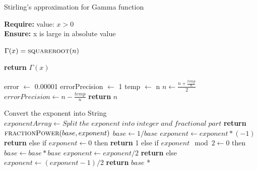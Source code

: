\documentclass[a4paper, 11pt]{article}
\begin{document}
\begin{algorithm}

\caption{Stirling's approximation for Gamma function}

\textbf{Require:}  value: $x > 0$ \\
\textbf{Ensure:} x is large in absolute value
\begin{algorithmic}[1]

    \State \indent $\Gamma (x) = \Call{squareroot}{n}$  
    
    \State \textbf{return} $\Gamma (x)$
    
    \State error $\leftarrow$ 0.00001
    \State errorPrecision $\leftarrow$ 1
    \State temp $\leftarrow$ n
        \State $n \leftarrow \frac{{n}+ \frac{temp}{n}}{2}$
        \State $errorPrecision \leftarrow n - \frac{temp}{n}$
    \EndWhile
    \State \textbf{return} $n$
    \EndProcedure
    
    \State Convert the exponent into String
    \State $exponentArray \leftarrow Split\; the\; exponent\; into\; integer\; and\; fractional\; part $
     \State \qquad \textbf{return} $\Call{fractionPower}{base, exponent}$ 
     \EndIf
     \State \qquad $base \leftarrow 1/base$
     \State \qquad $exponent \leftarrow exponent * (-1)$
     \State \textbf{return}  
     \EndIf
     \State else if $exponent \leftarrow 0$ then
     \State \qquad \textbf{return} 1 
     \State else if  $exponent \mod  2 \leftarrow 0$ then 
     \State \qquad $base \leftarrow base * base $
     \State \qquad $exponent \leftarrow exponent/2 $
     \State \textbf{return}  
     \State else
     \State \qquad $exponent \leftarrow (exponent-1)/2$
     \State \textbf{return}\; $base$ *  
    \EndProcedure

\EndProcedure
\end{algorithmic}
\end{algorithm}
\end{document}
